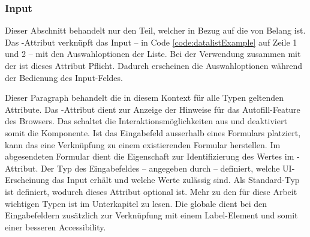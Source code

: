 \subsubsection{\color{dblue} Input}
\label{sec:input}

Dieser Abschnitt behandelt nur den Teil, welcher in Bezug auf die  von Belang ist. 
Das -Attribut verknüpft das Input – in Code \ref{code:datalistExample} auf Zeile 1 und 2 – mit den Auswahloptionen der Liste. 
Bei der Verwendung zusammen mit der  ist dieses Attribut Pflicht. 
Dadurch erscheinen die Auswahloptionen während der Bedienung des Input-Feldes. 

Dieser Paragraph behandelt die in diesem Kontext für alle Typen geltenden Attribute. 
Das -Attribut dient zur Anzeige der Hinweise für das Autofill-Feature des Browsers. 
Das  schaltet die Interaktionsmöglichkeiten aus und deaktiviert somit die Komponente. 
Ist das Eingabefeld ausserhalb eines Formulars platziert, kann das  eine Verknüpfung zu einem existierenden Formular herstellen. 
Im abgesendeten Formular dient die Eigenschaft  zur Identifizierung des Wertes im -Attribut. 
Der Typ des Eingabefeldes – angegeben durch  – definiert, welche UI-Erscheinung das Input erhält und welche Werte zulässig sind. 
Als Standard-Typ ist  definiert, wodurch dieses Attribut optional ist. 
Mehr zu den für diese Arbeit wichtigen Typen ist im Unterkapitel \textbf{} zu lesen. 
Die globale  dient bei den Eingabefeldern zusätzlich zur Verknüpfung mit einem Label-Element und somit einer besseren Accessibility. 


